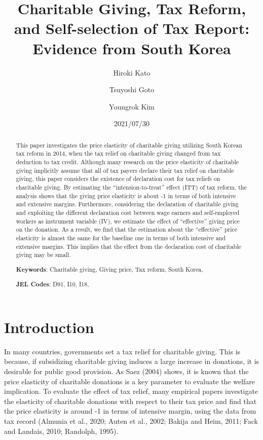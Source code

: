 \documentclass[
  11pt,
  a4paper,
]{article}
\title{Charitable Giving, Tax Reform, and Self-selection of Tax Report: Evidence from South Korea}
\author[]{Hiroki Kato}
\affil{Graduate School of Economics, Osaka University, Japan \thanks{vge008kh@stundent.econ.osaka-u.ac.jp}}
\author[]{Tsuyoshi Goto}
\affil{Graduate School of Social Sciences, Chiba University, Japan}
\author[]{Youngrok Kim}
\affil{Graduate School of Economics, Kobe University, Japan}
\date{2021/07/30}
\begin{document}
\begin{spacing}{1}
  \maketitle
\end{spacing}
\begin{spacing}{1}
  \begin{abstract}
    This paper investigates the price elasticity of charitable giving utilizing South Korean tax reform in 2014, when the tax relief on charitable giving changed from tax deduction to tax credit. Although many research on the price elasticity of charitable giving implicitly assume that all of tax payers declare their tax relief on charitable giving, this paper considers the existence of declaration cost for tax reliefs on charitable giving.
    By estimating the ``intension-to-treat'' effect (ITT) of tax reform, the analysis shows that the giving price elasticity is about -1 in terms of both intensive and extensive margins. Furthermore, considering the declaration of charitable giving and exploiting the different declaration cost between wage earners and self-employed workers as instrument variable (IV), we estimate the effect of ``effective'' giving price on the donation. As a result, we find that the estimation about the ``effective'' price elasticity is almost the same for the baseline one in terms of both intensive and extensive margins. This implies that the effect from the declaration cost of charitable giving may be small.
    
            \noindent
    \textbf{Keywords}: Charitable giving, Giving price, Tax reform, South Korea, 
        
        \noindent
    \textbf{JEL Codes}: D91, I10, I18, 
        
  \end{abstract}
\end{spacing}

\hypertarget{introduction}{%
\section{Introduction}\label{introduction}}

In many countries, governments set a tax relief for charitable giving. This is because, if subsidizing charitable giving induces a large increase in donations, it is desirable for public good provision. As Saez (2004) shows, it is known that the price elasticity of charitable donations is a key parameter to evaluate the welfare implication. To evaluate the effect of tax relief, many empirical papers investigate the elasticity of charitable donations with respect to their tax price and find that the price elasticity is around -1 in terms of intensive margin, using the data from tax record (Almunia et al., 2020; Auten et al., 2002; Bakija and Heim, 2011; Fack and Landais, 2010; Randolph, 1995).
\end{document}
